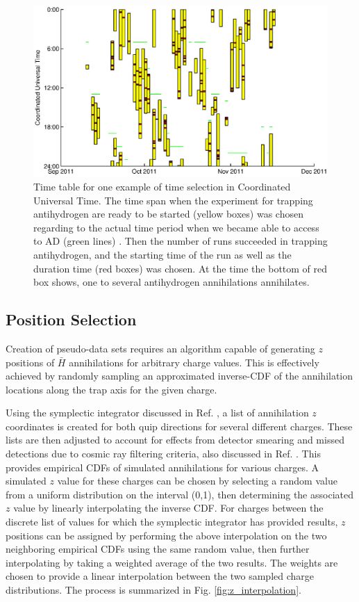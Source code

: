 \documentclass[superscriptaddress,aps,prb,11pt]{revtex4-1}
\begin{document}
\begin{figure}
  \includegraphics[scale=0.6]{eventTime_sim_example.eps}
  \caption{Time table for one example of time selection in Coordinated Universal Time. The time span when the experiment for trapping antihydrogen are ready to be started (yellow boxes) was chosen regarding to the actual time period when we became able to access to AD (green lines) . Then the number of runs succeeded in trapping antihydrogen, and the starting time  of the run as well as the duration time (red boxes) was chosen. At the time the bottom of red box shows, one to several antihydrogen annihilations annihilates.}
  \label{fig:eventTime_date_sim}
\end{figure}



\subsection*{Position Selection}
Creation of pseudo-data sets requires an algorithm capable of generating $z$ positions of $\bar{H}$ annihilations for arbitrary charge values.  This is effectively achieved by randomly sampling an approximated inverse-CDF of the annihilation locations along the trap axis for the given charge.

Using the symplectic integrator discussed in Ref. , a list of annihilation $z$ coordinates is created for both quip directions for several different charges.  These lists are then adjusted to account for effects from detector smearing and missed detections due to cosmic ray filtering criteria, also discussed in Ref. .  This provides empirical CDFs of simulated annihilations for various charges.  A simulated $z$ value for these charges can be chosen by selecting a random value from a uniform distribution on the interval (0,1), then determining the associated $z$ value by linearly interpolating the inverse CDF.  For charges between the discrete list of values for which the symplectic integrator has provided results, $z$ positions can be assigned by performing the above interpolation on the two neighboring empirical CDFs using the same random value, then further interpolating by taking a weighted average of the two results.  The weights are chosen to provide a linear interpolation between the two sampled charge distributions.  The process is summarized in Fig. \ref{fig:z_interpolation}.
\end{document}
